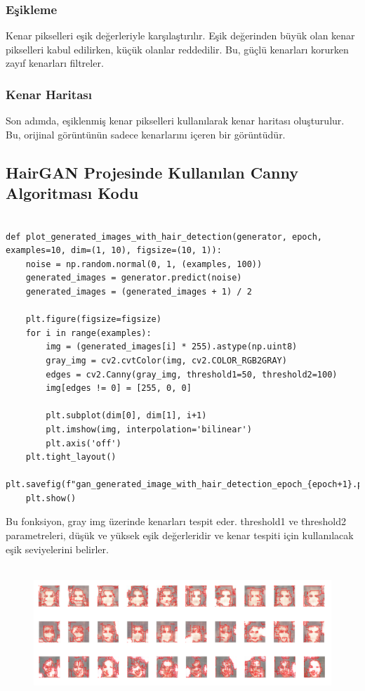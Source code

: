 \documentclass[12pt]{article}
\begin{document}
\subsubsection{Eşikleme}
Kenar pikselleri eşik değerleriyle karşılaştırılır. Eşik değerinden büyük olan kenar pikselleri kabul edilirken, küçük olanlar reddedilir. Bu, güçlü kenarları korurken zayıf kenarları filtreler.
\subsubsection{Kenar Haritası }
Son adımda, eşiklenmiş kenar pikselleri kullanılarak kenar haritası oluşturulur. Bu, orijinal görüntünün sadece kenarlarını içeren bir görüntüdür.
\subsection{HairGAN Projesinde Kullanılan Canny Algoritması Kodu}
\begin{lstlisting}

def plot_generated_images_with_hair_detection(generator, epoch, examples=10, dim=(1, 10), figsize=(10, 1)):
    noise = np.random.normal(0, 1, (examples, 100))
    generated_images = generator.predict(noise)
    generated_images = (generated_images + 1) / 2 

    plt.figure(figsize=figsize)
    for i in range(examples):
        img = (generated_images[i] * 255).astype(np.uint8)
        gray_img = cv2.cvtColor(img, cv2.COLOR_RGB2GRAY)
        edges = cv2.Canny(gray_img, threshold1=50, threshold2=100)   
        img[edges != 0] = [255, 0, 0]  

        plt.subplot(dim[0], dim[1], i+1)
        plt.imshow(img, interpolation='bilinear')
        plt.axis('off')
    plt.tight_layout()
    plt.savefig(f"gan_generated_image_with_hair_detection_epoch_{epoch+1}.png")
    plt.show()

\end{lstlisting}
Bu fonksiyon, gray img üzerinde kenarları tespit eder. threshold1 ve threshold2 parametreleri, düşük ve yüksek eşik değerleridir ve kenar tespiti için kullanılacak eşik seviyelerini belirler.
\begin{figure}[h]
    \centering
    \includegraphics[width=7\textwidth, height=5cm, keepaspectratio]{canny1.png}
    \label{fig:enter-label}
\end{figure}
\newpage
\end{document}

